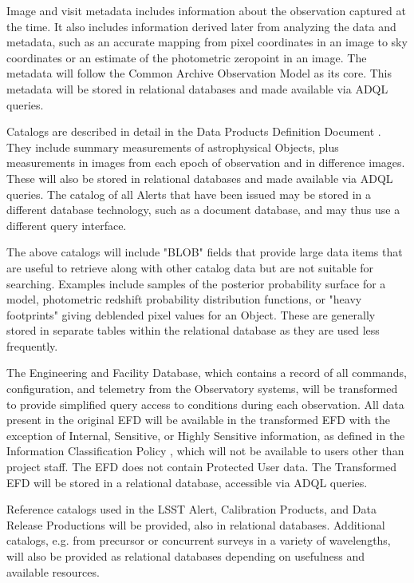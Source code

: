 Image and visit metadata includes information about the observation captured at
the time.  It also includes information derived later from analyzing the data
and metadata, such as an accurate mapping from pixel coordinates in an image to
sky coordinates or an estimate of the photometric zeropoint in an image.  The
metadata will follow the Common Archive Observation Model \citep{CAOM2} as its
core.  This metadata will be stored in relational databases and made available
via ADQL queries.

Catalogs are described in detail in the Data Products Definition Document
.  They include summary measurements of astrophysical Objects,
plus measurements in images from each epoch of observation and in difference
images.  These will also be stored in relational databases and made available
via ADQL queries.  The catalog of all Alerts that have been issued may be
stored in a different database technology, such as a document database, and
may thus use a different query interface.

The above catalogs will include "BLOB" fields that provide large data items
that are useful to retrieve along with other catalog data but are not
suitable for searching.  Examples include samples of the posterior probability
surface for a model, photometric redshift probability distribution functions,
or "heavy footprints" giving deblended pixel values for an Object.  These
are generally stored in separate tables within the relational database as
they are used less frequently.

The Engineering and Facility Database, which contains a record of all commands,
configuration, and telemetry from the Observatory systems, will be transformed
to provide simplified query access to conditions during each observation.  All
data present in the original EFD will be available in the transformed EFD with
the exception of Internal, Sensitive, or Highly Sensitive information, as
defined in the Information Classification Policy , which will
not be available to users other than project staff.  The EFD does not contain
Protected User data.  The Transformed EFD will be stored in a relational
database, accessible via ADQL queries.

Reference catalogs used in the LSST Alert, Calibration Products, and Data
Release Productions will be provided, also in relational databases.  Additional
catalogs, e.g. from precursor or concurrent surveys in a variety of
wavelengths, will also be provided as relational databases depending on
usefulness and available resources.

